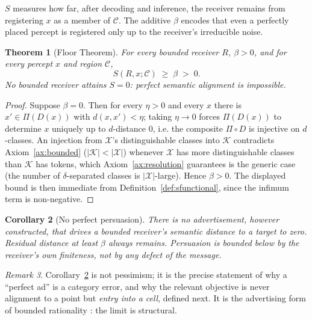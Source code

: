 \documentclass[twocolumn,11pt,a4paper]{article}
\theoremstyle{adv}
\newtheorem{theorem}{Theorem}[section]
\newtheorem{corollary}[theorem]{Corollary}
\theoremstyle{definition}
\theoremstyle{remark}
\newtheorem{remark}[theorem]{Remark}
\newcommand{\Out}{\mathcal{X}}         %
\newcommand{\Know}{\mathcal{K}}        %
\newcommand{\Cell}{\mathcal{C}}        %
\newcommand{\Dec}{D}                   %
\newcommand{\Proj}{\Pi}                %
\newcommand{\Recv}{R}                  %
\newcommand{\Sval}{S}                  %
\newcommand{\floor}{\beta}            %
\newcommand{\dist}{d}
\begin{document}
$\Sval$ measures how far, after decoding and inference, the receiver
remains from registering $x$ as a member of $\Cell$. The additive $\floor$
encodes that even a perfectly placed percept is registered only up to the
receiver's irreducible noise.

\begin{theorem}[Floor Theorem]
\label{thm:floor}
For every bounded receiver $\Recv$, $\floor>0$, and for every percept $x$
and region $\Cell$,
\[
  \Sval(\Recv,x;\Cell)\;\ge\;\floor\;>\;0.
\]
No bounded receiver attains $\Sval=0$: perfect semantic alignment is
impossible.
\end{theorem}

\begin{proof}
Suppose $\floor=0$. Then for every $\eta>0$ and every $x$ there is
$x'\in\Proj(\Dec(x))$ with $\dist(x,x')<\eta$; taking $\eta\to0$ forces
$\Proj(\Dec(x))$ to determine $x$ uniquely up to $\dist$-distance $0$, i.e.
the composite $\Proj\circ\Dec$ is injective on $\dist$-classes. An
injection from $\Out$'s distinguishable classes into $\Know$ contradicts
Axiom~\ref{ax:bounded} ($|\Know|<|\Out|$) whenever $\Out$ has more
distinguishable classes than $\Know$ has tokens, which Axiom~\ref{ax:resolution}
guarantees is the generic case (the number of $\delta$-separated classes is
$|\Out|$-large). Hence $\floor>0$. The displayed bound is then immediate
from Definition~\ref{def:sfunctional}, since the infimum term is
non-negative.
\end{proof}

\begin{corollary}[No perfect persuasion]
\label{cor:noperfect}
There is no advertisement, however constructed, that drives a bounded
receiver's semantic distance to a target to zero. Residual distance at
least $\floor$ always remains. Persuasion is bounded below by the
receiver's own finiteness, not by any defect of the message.
\end{corollary}

\begin{remark}
Corollary~\ref{cor:noperfect} is not pessimism; it is the precise
statement of why a ``perfect ad'' is a category error, and why the
relevant objective is never alignment to a point but \emph{entry into a
cell}, defined next. It is the advertising form of bounded rationality
\citep{simon1955,simon1956,gigerenzer1996}: the limit is structural.
\end{remark}

\end{document}

